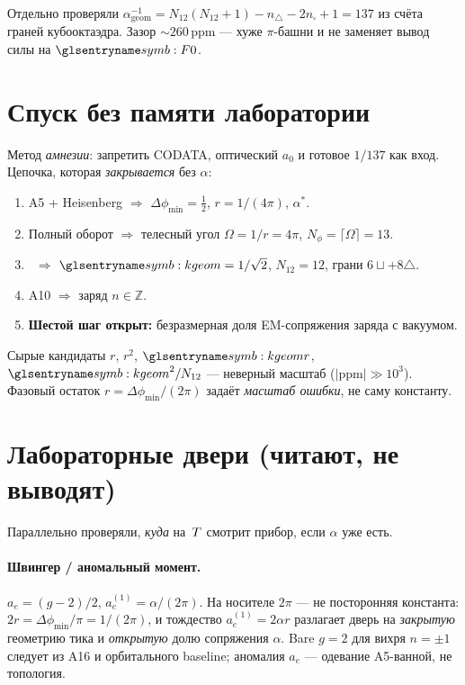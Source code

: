 \begin{remark}[Комбинаторика $137$]
Отдельно проверяли $\alpha^{-1}_{\mathrm{geom}}=N_{12}(N_{12}+1)-n_\triangle-2n_{\square}+1=137$
из счёта граней кубооктаэдра.
Зазор $\sim 260$\,ppm --- хуже $\pi$-башни и не заменяет вывод силы на $\ladderForce$.
\end{remark}

\section{Спуск без памяти лаборатории}

Метод \emph{амнезии}: запретить CODATA, оптический $a_0$ и готовое $1/137$ как вход.
Цепочка, которая \emph{закрывается} без $\alpha$:

\begin{enumerate}[label=\arabic*.]
\item A5 + Heisenberg $\Rightarrow$ $\Delta\phi_{\min}=\tfrac12$, $r=1/(4\pi)$, $\alpha^*$.
\item Полный оборот $\Rightarrow$ телесный угол $\Omega=1/r=4\pi$,
      $N_\phi=\lceil\Omega\rceil=13$.
\item \latGCKshort\ $\Rightarrow$ $\caKappaGeom=1/\sqrt{2}$, $N_{12}=12$, грани $6\sqcup+8\triangle$.
\item A10 $\Rightarrow$ заряд $n\in\mathbb{Z}$.
\item \textbf{Шестой шаг открыт:} безразмерная доля EM-сопряжения заряда с вакуумом.
\end{enumerate}

Сырые кандидаты $r$, $r^2$, $\caKappaGeom r$, $\caKappaGeom^2/N_{12}$ --- неверный масштаб
($|\mathrm{ppm}|\gg 10^3$).
Фазовый остаток $r=\Delta\phi_{\min}/(2\pi)$ задаёт \emph{масштаб ошибки}, не саму константу.

\section{Лабораторные двери (читают, не выводят)}

Параллельно проверяли, \emph{куда} на~$T$ смотрит прибор, если $\alpha$ уже есть.

\paragraph{Швингер / аномальный момент.}
$a_e=(g-2)/2$, $a_e^{(1)}=\alpha/(2\pi)$.
На носителе $2\pi$ --- не посторонняя константа:
$2r=\Delta\phi_{\min}/\pi=1/(2\pi)$, и тождество
$a_e^{(1)}=2\alpha r$ разлагает дверь на \emph{закрытую} геометрию тика
и \emph{открытую} долю сопряжения $\alpha$.
Bare $g=2$ для вихря $n=\pm1$ следует из A16 и орбитального baseline;
аномалия $a_e$ --- одевание A5-ванной, не топология.

